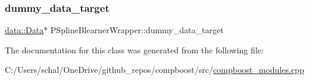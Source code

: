 \subsubsection{\texorpdfstring{dummy\+\_\+data\+\_\+target}{dummy\_data\_target}}
{\footnotesize\ttfamily \mbox{\hyperlink{classdata_1_1_data}{data\+::\+Data}}$\ast$ P\+Spline\+Blearner\+Wrapper\+::dummy\+\_\+data\+\_\+target\hspace{0.3cm}{\ttfamily [private]}}



The documentation for this class was generated from the following file\+:\begin{DoxyCompactItemize}
\item 
C\+:/\+Users/schal/\+One\+Drive/github\+\_\+repos/compboost/src/\mbox{\hyperlink{compboost__modules_8cpp}{compboost\+\_\+modules.\+cpp}}\end{DoxyCompactItemize}
